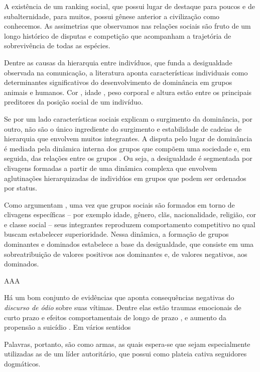 \documentclass[
12pt,				%
openright,			%
twoside,			%
a4paper,			%
english,			%
french,				%
spanish,			%
brazil				%
]{abntex2}
\begin{document}
A existência de um ranking social, que possui lugar de destaque para poucos e de subalternidade, para muitos, possui gênese anterior a civilização como conhecemos. As assimetrias que observamos nas relações sociais são fruto de um longo histórico de disputas e competição que acompanham a trajetória de sobrevivência de todas as espécies. 

Dentre as causas da hierarquia entre indivíduos, que funda a desigualdade observada na comunicação, a literatura aponta características individuais como determinantes significativos do desenvolvimento de dominância em grupos animais e humanos. Cor \cite{bakker1983determinants}, idade \cite{cote2000dominance, bohlin2001determinants}, peso corporal \cite{morgan2000predictors} e altura \cite{huang2002camera} estão entre os principais preditores da posição social de um indivíduo.    

Se por um lado características sociais explicam o surgimento da dominância, por outro, não são o único ingrediente do surgimento e estabilidade de cadeias de hierarquia que envolvem muitos integrantes. A disputa pelo lugar de dominância é mediada pela dinâmica interna dos grupos que compõem uma sociedade \cite{ridgeway1989dominance} e, em seguida, das relações entre os grupos \cite{chase1980social,chase2002individual}. Ou seja, a desigualdade é segmentada por clivagens formadas a partir de uma dinâmica complexa que envolvem aglutinações hierarquizadas de individúos em grupos que podem ser ordenados por status.  

Como argumentam , uma vez que grupos sociais são formados em torno de clivagens específicas -- por exemplo idade, gênero, clãs, nacionalidade, religião, cor e classe social -- seus integrantes reproduzem comportamento competitivo no qual buscam estabelecer superioridade. Nessa dinâmica, a formação de grupos dominantes e dominados estabelece a base da desigualdade, que consiste em uma sobreatribuição de valores positivos aos dominantes e, de valores negativos, aos dominados.



AAA

Há um bom conjunto de evidências que aponta consequências negativas do \emph{discurso de ódio} sobre suas vítimas. Dentre elas estão traumas emocionais de curto prazo e efeitos comportamentais de longo de prazo \cite{leets2002experiencing}, e aumento da propensão a suicídio \cite{mullen2004immigrant}. Em vários sentidos

Palavras, portanto, são como armas, as quais espera-se que sejam especialmente utilizadas  as de um líder autoritário, que possui como plateia cativa seguidores dogmáticos. 
\end{document}
